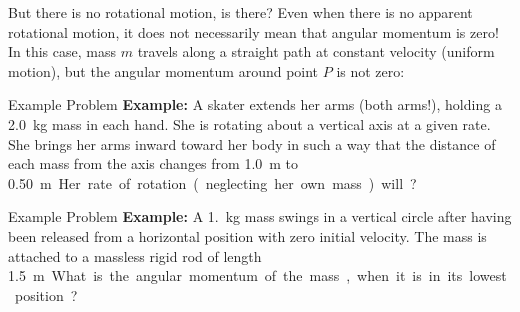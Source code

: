 \documentclass[12pt,compress,aspectratio=169]{beamer}
\begin{document}
\begin{frame}{But there is no rotational motion, is there?}
  Even when there is no apparent rotational motion, it does not necessarily
  mean that angular momentum is zero! In this case, mass $m$ travels along a
  straight path at constant velocity (uniform motion), but the angular momentum
  around point $P$ is not zero:
  \begin{center}
  \end{center}
\end{frame}



\begin{frame}{Example Problem}
  \textbf{Example:} A skater extends her arms (both arms!), holding a
  \SI{2.0}{\kilo\gram} mass in each hand. She is rotating about a vertical axis
  at a given rate. She brings her arms inward toward her body in such a way that
  the distance of each mass from the axis changes from \SI{1.0}{\metre} to
  \SI{.50}\metre. Her rate of rotation (neglecting her own mass) will?
\end{frame}




\begin{frame}{Example Problem}
  \textbf{Example:} A \SI{1.}{\kilo\gram} mass swings in a vertical circle
  after having been released from a horizontal position with zero initial
  velocity. The mass is attached to a massless rigid rod of length
  \SI{1.5}\metre. What is the angular momentum of the mass, when it is in its
  lowest position?
\end{frame}
\end{document}
